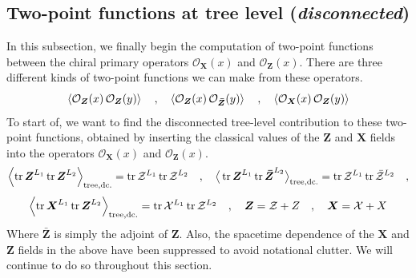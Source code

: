 \subsection{Two-point functions at tree level (\textit{disconnected})}
In this subsection, we finally begin the computation of two-point functions between the chiral primary operators $\mathcal{O}_{\boldsymbol{X}}(x)$ and $\mathcal{O}_{\boldsymbol{Z}}(x)$. There are three different kinds of two-point functions we can make from these operators.
%
%
\begin{equation}\label{the two-point functions}
\expval{\mathcal{O}_{\boldsymbol{Z}}(x) \, \mathcal{O}_{\boldsymbol{Z}}(y)}
%
\quad , \quad
%
\expval{\mathcal{O}_{\boldsymbol{Z}}(x) \, \mathcal{O}_{\boldsymbol{\bar{Z}}}(y)}
%
\quad , \quad
%
\expval{\mathcal{O}_{\boldsymbol{X}}(x) \, \mathcal{O}_{\boldsymbol{Z}}(y)}
\end{equation}
%
%
To start of, we want to find the disconnected tree-level contribution to these two-point functions, obtained by inserting the classical values of the ${\boldsymbol{Z}}$ and ${\boldsymbol{X}}$ fields into the operators $\mathcal{O}_{\boldsymbol{X}}(x)$ and $\mathcal{O}_{\boldsymbol{Z}}(x)$.
%
%
\begin{equation*}
\expval{\tr \boldsymbol{Z}^{L_1} \tr \boldsymbol{Z}^{L_2} }_{\mathrm{tree, dc.}}
%
=
%
\tr \mathcal{Z}^{L_1}
\tr \mathcal{Z}^{L_2}
%
\quad , \quad
%
\big\langle \tr \boldsymbol{Z}^{L_1} \tr \boldsymbol{\bar{Z}}^{L_2} \big\rangle_{\mathrm{tree, dc.}}
%
=
%
\tr \mathcal{Z}^{L_1}
\tr \bar{\mathcal{Z}}^{L_2}
%
\quad ,
\end{equation*}
%
%
\begin{equation}\label{tree-level dc.}
\expval{\tr \boldsymbol{X}^{L_1} \tr \boldsymbol{Z}^{L_2} }_{\mathrm{tree, dc.}}
%
=
%
\tr \mathcal{X}^{L_1}
\tr \mathcal{Z}^{L_2}
%
\quad , \quad
%
{\boldsymbol{Z}} = \mathcal{Z} + Z
%
\quad , \quad
%
{\boldsymbol{X}} = \mathcal{X} + X
\end{equation}
%
%
Where ${\boldsymbol{\bar{Z}}}$ is simply the adjoint of ${\boldsymbol{Z}}$. Also, the spacetime dependence of the ${\boldsymbol{X}}$ and ${\boldsymbol{Z}}$ fields in the above have been suppressed to avoid notational clutter. We will continue to do so throughout this section.\\

